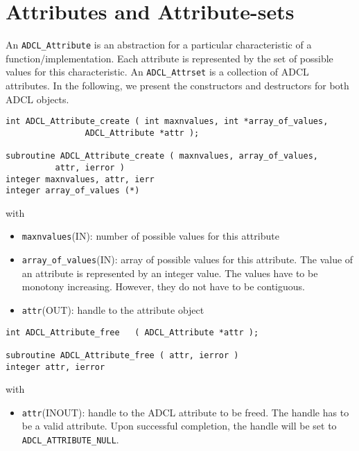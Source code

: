 \section{Attributes and Attribute-sets}

An {\tt ADCL\_Attribute} is an abstraction for a particular characteristic of a function/implementation. Each attribute is represented by the set of possible values for this characteristic.  An {\tt ADCL\_Attrset} is a collection of ADCL attributes.
In the following, we present the constructors and destructors for both ADCL objects.

\begin{verbatim}
int ADCL_Attribute_create ( int maxnvalues, int *array_of_values, 
			    ADCL_Attribute *attr );

subroutine ADCL_Attribute_create ( maxnvalues, array_of_values, 
          attr, ierror )
integer maxnvalues, attr, ierr
integer array_of_values (*)
\end{verbatim}
with
\begin{itemize}
\item {\tt maxnvalues}(IN): number of possible values for this attribute
\item {\tt array\_of\_values}(IN): array of possible values for this attribute. The 
	value of an attribute is represented by an integer value. The values have to be 
	monotony increasing. However, they do not have to be contiguous.
\item {\tt attr}(OUT): handle to the attribute object
\end{itemize} 	

\hspace{1cm}
\begin{verbatim}
int ADCL_Attribute_free   ( ADCL_Attribute *attr );

subroutine ADCL_Attribute_free ( attr, ierror )
integer attr, ierror
\end{verbatim}
with
\begin{itemize}
\item {\tt attr}(INOUT): handle to the ADCL attribute to be freed. The handle has to be a valid attribute.
    	Upon successful completion, the handle will be set to {\tt ADCL\_ATTRIBUTE\_NULL}.
\end{itemize}


